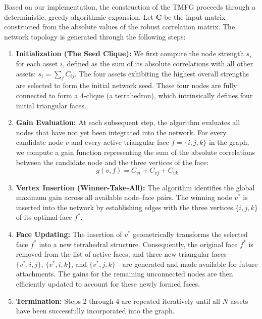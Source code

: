 \documentclass[fleqn]{rbfin}
\begin{document}
Based on our implementation, the construction of the TMFG proceeds through a deterministic, greedy algorithmic expansion. Let $\mathbf{C}$ be the input matrix constructed from the absolute values of the robust correlation matrix. The network topology is generated through the following steps:

\begin{enumerate}
    \item \textbf{Initialization (The Seed Clique):} We first compute the node strength $s_i$ for each asset $i$, defined as the sum of its absolute correlations with all other assets: $s_i = \sum_{j} C_{ij}$. The four assets exhibiting the highest overall strengths are selected to form the initial network seed. These four nodes are fully connected to form a 4-clique (a tetrahedron), which intrinsically defines four initial triangular faces.
    
    \item \textbf{Gain Evaluation:} At each subsequent step, the algorithm evaluates all nodes that have not yet been integrated into the network. For every candidate node $v$ and every active triangular face $f = \{i, j, k\}$ in the graph, we compute a gain function representing the sum of the absolute correlations between the candidate node and the three vertices of the face:
    \begin{equation}
        g(v, f) = C_{vi} + C_{vj} + C_{vk}
    \end{equation}
    
    \item \textbf{Vertex Insertion (Winner-Take-All):} The algorithm identifies the global maximum gain across all available node--face pairs. The winning node $v^*$ is inserted into the network by establishing edges with the three vertices $\{i, j, k\}$ of its optimal face $f^*$.
    
    \item \textbf{Face Updating:} The insertion of $v^*$ geometrically transforms the selected face $f^*$ into a new tetrahedral structure. Consequently, the original face $f^*$ is removed from the list of active faces, and three new triangular faces—$\{v^*, i, j\}$, $\{v^*, i, k\}$, and $\{v^*, j, k\}$—are generated and made available for future attachments. The gains for the remaining unconnected nodes are then efficiently updated to account for these newly formed faces.
    
    \item \textbf{Termination:} Steps 2 through 4 are repeated iteratively until all $N$ assets have been successfully incorporated into the graph.
\end{enumerate}
\end{document}

